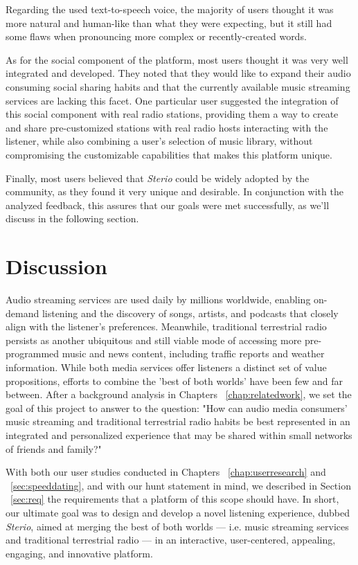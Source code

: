 {Regarding the used text-to-speech voice, the majority of users thought it was more natural and human-like than what they were expecting, but it still had some flaws when pronouncing more complex or recently-created words.

As for the social component of the platform, most users thought it was very well integrated and developed. They noted that they would like to expand their audio consuming social sharing habits and that the currently available music streaming services are lacking this facet. One particular user suggested the integration of this social component with real radio stations, providing them a way to create and share pre-customized stations with real radio hosts interacting with the listener, while also combining a user's selection of music library, without compromising the customizable capabilities that makes this platform unique.

Finally, most users believed that \textit{Sterio} could be widely adopted by the community, as they found it very unique and desirable. In conjunction with the analyzed feedback, this assures that our goals were met successfully, as we'll discuss in the following section.

\section{Discussion}

Audio streaming services are used daily by millions worldwide, enabling on-demand listening and the discovery of songs, artists, and podcasts that closely align with the listener’s preferences. Meanwhile, traditional terrestrial radio persists as another ubiquitous and still viable mode of accessing more pre-programmed music and news content, including traffic reports and weather information. While both media services offer listeners a distinct set of value propositions, efforts to combine the 'best of both worlds' have been few and far between. After a background analysis in Chapters ~\ref{chap:relatedwork}, we set the goal of this project to answer to the question: "How can audio media consumers' music streaming and traditional terrestrial radio habits be best represented in an integrated and personalized experience that may be shared within small networks of friends and family?"

With both our user studies conducted in Chapters ~\ref{chap:userresearch} and ~\ref{sec:speeddating}, and with our hunt statement in mind, we described in Section ~\ref{sec:req} the requirements that a platform of this scope should have. In short, our ultimate goal was to design and develop a novel listening experience, dubbed \textit{Sterio}, aimed at merging the best of both worlds — i.e. music streaming services and traditional terrestrial radio — in an interactive, user-centered, appealing, engaging, and innovative platform.

}
